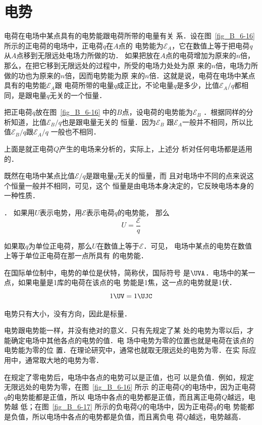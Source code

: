 \section{电势}
电荷在电场中某点具有的电势能跟电荷所带的电量有关
系．设在图~\ref{fig_B_6-16} 所示的正电荷的电场中，正电荷$q$在$A$点的
电势能为$\mathcal{E}_A$，它在数值上等于把电荷$q$从$A$点移到无限远处电场力所做的功．
如果把放在$A$点的电荷增加为原来的$n$倍，
那么，在把它移到无限远处的过程中，所受的电场力处处为原
来的$n$倍，电场力所做的功也为原来的$n$倍，因而电势能为原
来的$n$倍．这就是说，电荷在电场中某点具有的电势能$\mathcal{E}_A$跟
电荷所带的电量$q$成正比，不论电量$q$是多少，比值$\mathcal{E}_A/q$都相
同，是跟电量$q$无关的一个恒量．

把正电荷$q$放在图~\ref{fig_B_6-16} 中的$B$点，设电荷的电势能为$\mathcal{E}_B$
．根据同样的分析知道，比值$\mathcal{E}_B/q$也是跟电量无关的
恒量．因为$\mathcal{E}_B$
跟$\mathcal{E}_A$一般并不相同，所以比值$\mathcal{E}_B/q$跟$\mathcal{E}_A/q$
一般也不相同．

上面是就正电荷$Q$产生的电场来分析的，实际上，上述分
析对任何电场都是适用的．

既然在电场中某点比值$\mathcal{E}/q$是跟电量$q$无关的恒量，而
且对电场中不同的点来说这个恒量一般并不相同，可见，这个
恒量是由电场本身决定的，它反映电场本身的一种性质．

．
如果用$U$表示电势，用$\mathcal{E}$表示电荷$q$的电势能，
那么
\[U=\frac{\mathcal{E}}{q} \]

如果取$q$为单位正电荷，那么$U$在数值上等于$\mathcal{E}$．可见，
电场中某点的电势在数值上等于单位正电荷在那一点所具有
的电势能．

在国际单位制中，电势的单位是伏特，简称伏，国际符号
是$\UVA$．电场中的某一点，如果电量是1库的电荷在该点的电
势能是1焦，这一点的电势就是1伏．
\[ 1 \UV =1 \UJC \]

电势只有大小，没有方向，因此是标量．

电势跟电势能一样，并没有绝对的意义．只有先规定了某
处的电势为零以后，才能确定电场中其他各点的电势的值．电
场中电势为零的位置也就是电荷在该点的电势能为零的位
置．在理论研究中，通常也就取无限远处的电势为零．在实
际应用中，通常取大地的电势为零．

在规定了零电势后，电场中各点的电势可以是正值，也可
以是负值．例如，规定无限远处的电势为零，在图~\ref{fig_B_6-16} 所示
的正电荷$Q$的电场中，因为正电荷$q$的电势能都是正值，所以
电场中各点的电势都是正值，而且离正电荷$Q$越远，电势越
低；在图~\ref{fig_B_6-17} 所示的负电荷$Q$的电场中，因为正电荷$q$的电
势能都是负值，所以电场中各点的电势都是负值，而且离负电
荷$Q$越远，电势越高．

